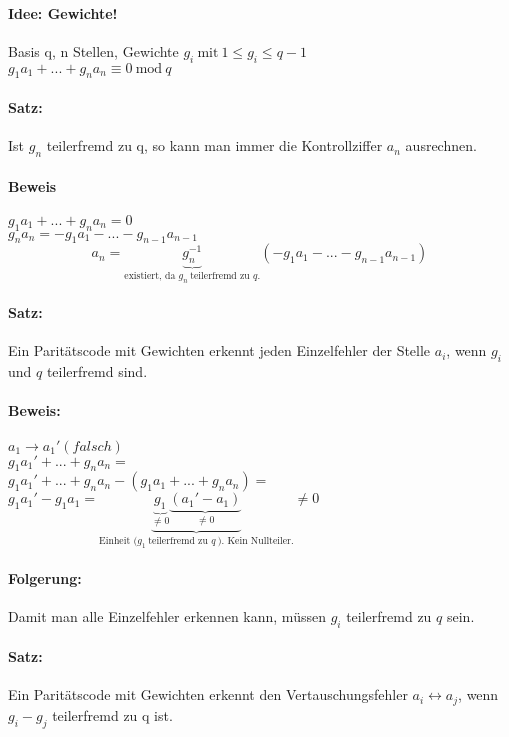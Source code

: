 \paragraph{Idee: Gewichte!} Basis q, n Stellen, Gewichte $g_i \ \mbox{mit} \ 1 \le g_i \le q-1$ \\
$ g_1 a_1 + ... + g_n a_n \equiv 0 \ \mbox{mod} \ q$ 

\paragraph{Satz:}
Ist $g_n$ teilerfremd zu q, so kann man immer die Kontrollziffer $a_n$ ausrechnen.

\paragraph{Beweis}
$ g_1 a_1 + ... + g_n a_n = 0$ \\ 
$ g_n a_n = - g_1 a_1 - ... - g_{n-1} a_{n-1}$\\
\[a_n = \underbrace{g_{n}^{-1}}_{\mbox{existiert, da } g_n \ \mbox{teilerfremd zu } q.} (- g_1 a_1 - ... - g_{n-1} a_{n-1})
\]


\paragraph{Satz:} Ein Paritätscode mit Gewichten erkennt jeden Einzelfehler der Stelle $a_i$, wenn $g_i$ und $q$ teilerfremd sind.

\paragraph{Beweis:} 
$a_1 \rightarrow a_1' (falsch)$\\
$g_1 a_1' + ... + g_n a_n = $\\
$g_1 a_1' + ... + g_n a_n - (g_1 a_1 + ... + g_n a_n) = $\\
$g_1 a_1' - g_1 a_1 = \underbrace{\underbrace{g_1}_{\neq 0} \underbrace{(a_1' - a_1)}_{\neq 0}}_{\mbox{Einheit (} g_1 \ \mbox{teilerfremd zu }q \ \mbox{). Kein Nullteiler.}} \neq 0$\\

\paragraph{Folgerung:} Damit man alle Einzelfehler erkennen kann, müssen $g_i$ teilerfremd zu $q$ sein.

\paragraph{Satz:} Ein Paritätscode mit Gewichten erkennt den Vertauschungsfehler $a_i \leftrightarrow a_j$, wenn $g_i - g_j$ teilerfremd zu q ist. 

